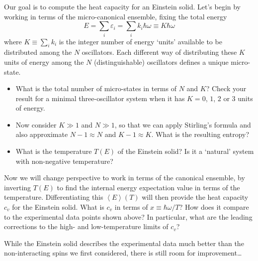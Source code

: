 \documentclass[12 pt]{article} %
\newcommand{\eps}{\ensuremath{\varepsilon} }
\newcommand{\om}{\ensuremath{\omega} }
\newcommand{\vev}[1]{\ensuremath{\left\langle #1 \right\rangle} }
\begin{document}
Our goal is to compute the heat capacity for an Einstein solid.
Let's begin by working in terms of the micro-canonical ensemble, fixing the total energy
\begin{equation*}
  E = \sum_i \eps_i = \sum_i k_i\hbar\om \equiv K\hbar\om
\end{equation*}
where $K \equiv \sum_i k_i$ is the integer number of energy `units' available to be distributed among the $N$ oscillators.
Each different way of distributing these $K$ units of energy among the $N$ (distinguishable) oscillators defines a unique micro-state.

\begin{itemize}
  \item What is the total number of micro-states in terms of $N$ and $K$?
        Check your result for a minimal three-oscillator system when it has $K = 0$, $1$, $2$ or $3$ units of energy.

  \item Now consider $K \gg 1$ and $N \gg 1$, so that we can apply Stirling's formula and also approximate $N - 1 \approx N$ and $K - 1 \approx K$.
        What is the resulting entropy?

  \item What is the temperature $T(E)$ of the Einstein solid?
        Is it a `natural' system with non-negative temperature?
\end{itemize}

Now we will change perspective to work in terms of the canonical ensemble, by inverting $T(E)$ to find the internal energy expectation value in terms of the temperature.
Differentiating this $\vev{E}\!(T)$ will then provide the heat capacity $c_v$ for the Einstein solid.
What is $c_v$ in terms of $x \equiv \hbar \om / T$?
How does it compare to the experimental data points shown above?
In particular, what are the leading corrections to the high- and low-temperature limits of $c_v$?

While the Einstein solid describes the experimental data much better than the non-interacting spins we first considered, there is still room for improvement\dots
\end{document}
